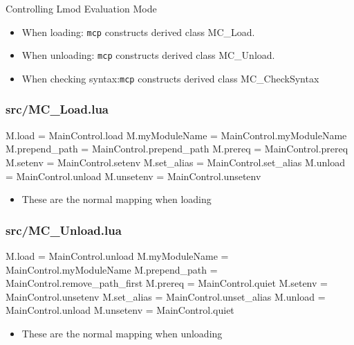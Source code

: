 \documentclass{beamer}
\begin{document}
\begin{frame}{Controlling Lmod Evaluation Mode}
  \begin{itemize}
    \item When loading: \texttt{mcp} constructs derived class
      MC\_Load.
    \item When unloading: \texttt{mcp} constructs derived class
      MC\_Unload.
    \item When checking syntax:\texttt{mcp} constructs derived class
      MC\_CheckSyntax
  \end{itemize}
\end{frame}



\begin{frame}[fragile]
    \frametitle{src/MC\_Load.lua}
 {\tiny
    \begin{semiverbatim}
M.load                 = MainControl.load
M.myModuleName         = MainControl.myModuleName
M.prepend\_path         = MainControl.prepend\_path
M.prereq               = MainControl.prereq
M.setenv               = MainControl.setenv
M.set\_alias            = MainControl.set\_alias
M.unload               = MainControl.unload
M.unsetenv             = MainControl.unsetenv
    \end{semiverbatim}
}
  \begin{itemize}
    \item These are the normal mapping when loading
  \end{itemize}

\end{frame}

\begin{frame}[fragile]
    \frametitle{src/MC\_Unload.lua}
 {\tiny
    \begin{semiverbatim}
M.load                 = MainControl.unload
M.myModuleName         = MainControl.myModuleName
M.prepend\_path         = MainControl.remove\_path\_first
M.prereq               = MainControl.quiet
M.setenv               = MainControl.unsetenv
M.set\_alias            = MainControl.unset\_alias
M.unload               = MainControl.unload
M.unsetenv             = MainControl.quiet
    \end{semiverbatim}
}
  \begin{itemize}
    \item These are the normal mapping when unloading
  \end{itemize}
\end{frame}
\end{document}

